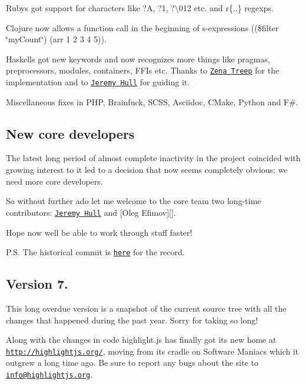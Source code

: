 \begin{DoxyItemize}
\item Ruby\textquotesingle{}s got support for characters like {\ttfamily ?A}, {\ttfamily ?1}, {\ttfamily ?\textbackslash{}012} etc. and {\ttfamily r\{..\}} regexps.
\item Clojure now allows a function call in the beginning of s-\/expressions {\ttfamily ((\$filter \char`\"{}my\+Count\char`\"{}) (arr 1 2 3 4 5))}.
\item Haskell\textquotesingle{}s got new keywords and now recognizes more things like pragmas, preprocessors, modules, containers, F\+F\+Is etc. Thanks to \href{https://github.com/treep}{\tt Zena Treep} for the implementation and to \href{https://github.com/sourrust}{\tt Jeremy Hull} for guiding it.
\item Miscellaneous fixes in P\+HP, Brainfuck, S\+C\+SS, Asciidoc, C\+Make, Python and F\#.
\end{DoxyItemize}

\subsection*{New core developers}

The latest long period of almost complete inactivity in the project coincided with growing interest to it led to a decision that now seems completely obvious\+: we need more core developers.

So without further ado let me welcome to the core team two long-\/time contributors\+: \href{https://github.com/sourrust}{\tt Jeremy Hull} and \mbox{[}Oleg Efimov\mbox{]}\mbox{[}\mbox{]}.

Hope now we\textquotesingle{}ll be able to work through stuff faster!

P.\+S. The historical commit is \href{http://roudakov.ru/}{\tt here} for the record.

\subsection*{Version 7.}

This long overdue version is a snapshot of the current source tree with all the changes that happened during the past year. Sorry for taking so long!

Along with the changes in code highlight.\+js has finally got its new home at \href{http://highlightjs.org/}{\tt http\+://highlightjs.\+org/}, moving from its cradle on Software Maniacs which it outgrew a long time ago. Be sure to report any bugs about the site to \href{mailto:info@highlightjs.org}{\tt info@highlightjs.\+org}.

